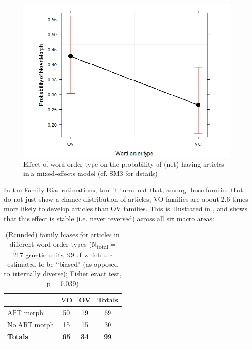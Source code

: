 \documentclass[output=paper]{langsci/langscibook}
\begin{document}
\begin{figure}
\includegraphics[height=.3\textheight]{figures/schmidtkebode-img2.png}
\caption{Effect of word order type on the probability of (not) having articles in a mixed-effects model (cf. SM3 for details)}
\label{fig:ksb:2}
\end{figure}

In the Family Bias estimations, too, it turns out that, among those families that do not just show a chance distribution of articles, VO families are about 2.6 times more likely to develop articles than OV families. This is illustrated in , and  shows that this effect is stable (i.e. never reversed) across all six macro areas:
 

\begin{table}
\begin{tabularx}{.8\textwidth}{lSSS}
\lsptoprule
& VO &   OV &   Totals\\
\midrule 
ART morph & 50 & 19 & 69\\
No ART morph & 15 & 15 & 30\\
\midrule
\textbf{Totals} & \textbf{65} & \textbf{34} & \textbf{99}\\
\lspbottomrule
\end{tabularx} 
\caption{(Rounded) family biases for articles in different word-order types (N\textsubscript{total} = 217 genetic units, 99 of which are estimated to be “biased” (as opposed to internally diverse); Fisher exact test, p = 0.039)}
\label{tab:ksb:3}
\end{table}
   
\end{document}
